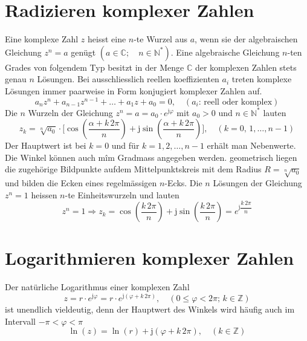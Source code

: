 \section{Radizieren komplexer Zahlen}
Eine komplexe Zahl $z$ heisst eine $n$-te Wurzel aus $a$, wenn sie der algebraischen Gleichung $z^n=a$ genügt $\left(a\in\mathbb{C};\quad n\in \mathbb{N}^*\right)$.
\newline\newline
Eine algebraische Gleichung $n$-ten Grades von folgendem Typ besitzt in der Menge $\mathbb{C}$ der komplexen Zahlen stets genau $n$ Lösungen. Bei ausschliesslich reellen koeffizienten $a_i$ treten komplexe Lösungen immer paarweise in Form konjugiert komplexer Zahlen auf.
\begin{equation}
\boxed{a_nz^n+a_{n-1}z^{n-1}+\dotso + a_1z+a_0=0,\quad \left(a_i:\,\text{reell oder komplex}\right)}
\end{equation}
Die $n$ Wurzeln der Gleichung $z^n=a=a_0\cdot e^{\text{j}\varphi}$ mit $a_0>0$ und $n\in \mathbb{N}^*$ lauten
\begin{equation}
\boxed{z_k=\sqrt[n]{a_0}\cdot \Big[\cos\left(\dfrac{\alpha+k\,2\pi}{n}\right)+\text{j}\sin\left(\dfrac{\alpha+k\,2\pi}{n}\right)\Big],\quad \left(k=0,\,1,\dotso, n-1\right)}
\end{equation}
Der Hauptwert ist bei $k=0$ und für $k=1, 2, \dotso, n-1$ erhält man Nebenwerte. Die Winkel können auch mîm Gradmass angegeben werden.
\newline\newline
geometrisch liegen die zugehörige Bildpunkte aufdem Mittelpunktskreis mit dem Radius $R=\sqrt[n]{a_0}$ und bilden die Ecken eines regelmässigen $n$-Ecks.
\newline\newline
Die $n$ Lösungen der Gleichung $z^n=1$ heissen $n$-te Einheitswurzeln und lauten
\begin{equation}
\boxed{z^n=1\Longrightarrow z_k=\cos\left(\dfrac{k\,2\pi}{n}\right)+\text{j}\sin\left(\dfrac{k\,2\pi}{n}\right)=e^{\text{j}\dfrac{k\,2\pi}{n}}}
\end{equation}
\section{Logarithmieren komplexer Zahlen}
Der natürliche Logarithmus einer komplexen Zahl
\begin{equation}
\boxed{z=r\cdot e^{\text{j}\varphi}=r\cdot e^{\text{j}\left(\varphi+k\,2\pi\right)},\quad \left(0\leq \varphi< 2\pi;\,k\in \mathbb{Z}\right)}
\end{equation}
ist unendlich vieldeutig, denn der Hauptwert des Winkels wird häufig auch im Intervall $-\pi<\varphi < \pi$
\begin{equation}
\boxed{\ln\left(z\right)=\ln\left(r\right)+\text{j}\left(\varphi+k\,2\pi\right),\quad \left(k\in \mathbb{Z}\right)}
\end{equation}
